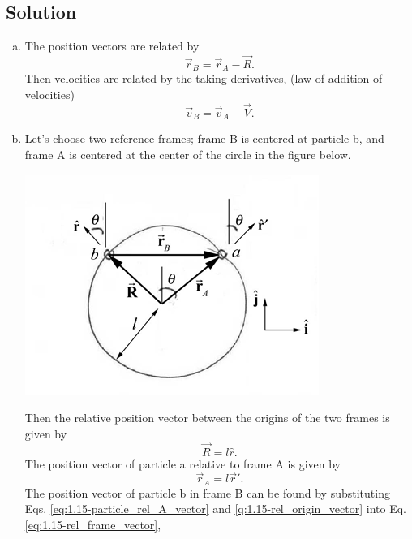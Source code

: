 \documentclass[solutions]{esg8012pset}
\begin{document}
\subsection*{Solution}
  \begin{enumerate}[a.]
    \item The position vectors are related by
      \begin{equation} \vec r_B = \vec r_A - \vec R. \label{eq:1.15-rel_frame_vector}\end{equation}
      Then velocities are related by the taking derivatives, (law of addition of velocities)
      \begin{equation} \vec v_B = \vec v_A - \vec V. \label{eq:1.15-particle_A_vector}\end{equation} %
    \item Let's choose two reference frames; frame B is centered at particle b, and frame A is centered at the center of the circle in the figure below.
      \begin{center}\includegraphics{ps01_Solution_06_01}\end{center}
      Then the relative position vector between the origins of the two frames is given by
      \begin{equation} \vec R = l\hat r. \label{eq:1.15-rel_origin_vector}\end{equation}
      The position vector of particle a relative to frame A is given by
      \begin{equation} \vec r_A = l\vec r'. \label{eq:1.15-particle_rel_A_vector}\end{equation}
      The position vector of particle b in frame B can be found by substituting Eqs. \ref{eq:1.15-particle_rel_A_vector} and \ref{q:1.15-rel_origin_vector} into Eq. \ref{eq:1.15-rel_frame_vector},

\end{enumerate}
\end{document}
